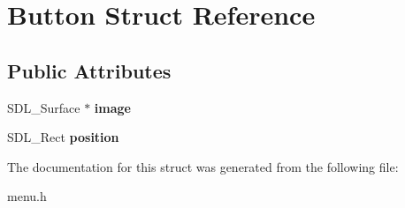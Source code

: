 \hypertarget{structButton}{}\section{Button Struct Reference}
\label{structButton}
\subsection*{Public Attributes}
\begin{DoxyCompactItemize}
\item 
\mbox{\label{structButton_a9b46ba5cac45b47ada9d1491ffff575d}} 
S\+D\+L\+\_\+\+Surface $\ast$ {\bfseries image}
\item 
\mbox{\label{structButton_a0343ba330902623017b8915e2d629a83}} 
S\+D\+L\+\_\+\+Rect {\bfseries position}
\end{DoxyCompactItemize}


The documentation for this struct was generated from the following file\+:\begin{DoxyCompactItemize}
\item 
menu.\+h\end{DoxyCompactItemize}
